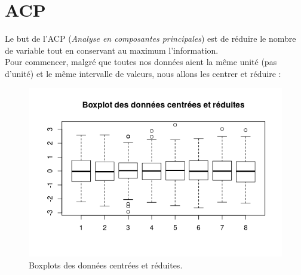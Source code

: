 \documentclass[11pt]{article}
\begin{document}
\section{ACP}
Le but de l'ACP (\emph{Analyse en composantes principales}) est de réduire le nombre de variable tout en conservant au maximum l'information.\\
Pour commencer, malgré que toutes nos données aient la même unité (pas d'unité) et le même intervalle de valeurs, nous allons les centrer et réduire :
\begin{figure}[H]
\centering
\includegraphics[scale=1]{boxplotCR.png}
\caption{Boxplots des données centrées et réduites.}
\end{figure}
\end{document}
